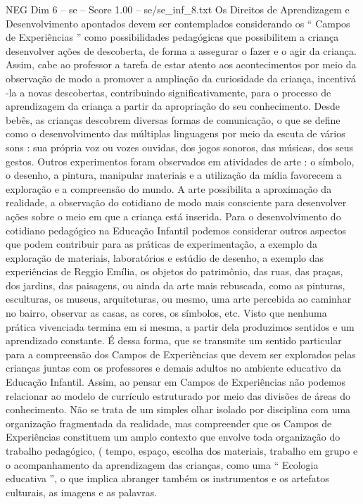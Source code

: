 \begin{textsample}{NEG Dim 6 – se – Score 1.00 – se/se\_inf\_8.txt}
Os Direitos de Aprendizagem e Desenvolvimento apontados devem ser contemplados considerando os “ Campos de Experiências ” como possibilidades pedagógicas que possibilitem a criança desenvolver ações de descoberta, de forma a assegurar o fazer e o agir da criança.
Assim, cabe ao professor a tarefa de estar atento aos acontecimentos por meio da observação de modo a promover a ampliação da curiosidade da criança, incentivá -la a novas descobertas, contribuindo significativamente, para o processo de aprendizagem da criança a partir da apropriação do seu conhecimento.
Desde bebês, as crianças descobrem diversas formas de comunicação, o que se define como o desenvolvimento das múltiplas linguagens por meio da escuta de vários sons : sua própria voz ou vozes ouvidas, dos jogos sonoros, das músicas, dos seus gestos.
Outros experimentos foram observados em atividades de arte : o símbolo, o desenho, a pintura, manipular materiais e a utilização da mídia favorecem a exploração e a compreensão do mundo.
A arte possibilita a aproximação da realidade, a observação do cotidiano de modo mais consciente para desenvolver ações sobre o meio em que a criança está inserida.
Para o desenvolvimento do cotidiano pedagógico na Educação Infantil podemos considerar outros aspectos que podem contribuir para as práticas de experimentação, a exemplo da exploração de materiais, laboratórios e estúdio de desenho, a exemplo das experiências de Reggio Emília, os objetos do patrimônio, das ruas, das praças, dos jardins, das paisagens, ou ainda da arte mais rebuscada, como as pinturas, esculturas, os museus, arquiteturas, ou mesmo, uma arte percebida ao caminhar no bairro, observar as casas, as cores, os símbolos, etc.
Visto que nenhuma prática vivenciada termina em si mesma, a partir dela produzimos sentidos e um aprendizado constante.
É dessa forma, que se transmite um sentido particular para a compreensão dos Campos de Experiências que devem ser explorados pelas crianças juntas com os professores e demais adultos no ambiente educativo da Educação Infantil.
Assim, ao pensar em Campos de Experiências não podemos relacionar ao modelo de currículo estruturado por meio das divisões de áreas do conhecimento.
Não se trata de um simples olhar isolado por disciplina com uma organização fragmentada da realidade, mas compreender que os Campos de Experiências constituem um amplo contexto que envolve toda organização do trabalho pedagógico, ( tempo, espaço, escolha dos materiais, trabalho em grupo e o acompanhamento da aprendizagem das crianças, como uma “ Ecologia educativa ”, o que implica abranger também os instrumentos e os artefatos culturais, as imagens e as palavras.

\end{textsample}
